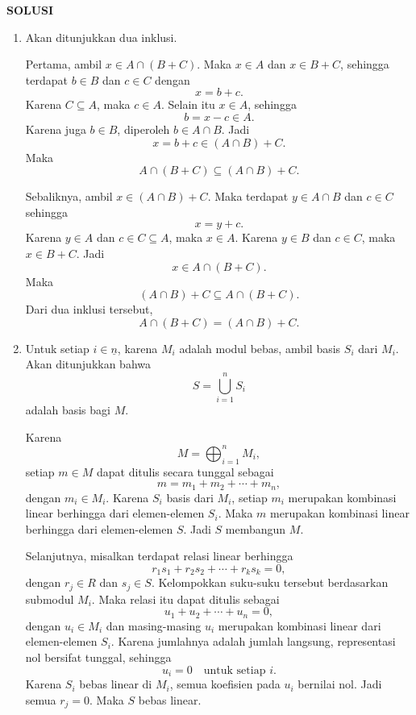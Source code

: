\documentclass[11pt,letterpaper]{article}
\begin{document}
\newpage
\begin{center}
  \textbf{SOLUSI}
\end{center}

\begin{enumerate}
  \item Akan ditunjukkan dua inklusi.

        Pertama, ambil $x \in A \cap (B+C)$. Maka $x \in A$ dan $x \in B+C$, sehingga terdapat $b \in B$ dan $c \in C$ dengan
        \[
          x=b+c.
        \]
        Karena $C \subseteq A$, maka $c \in A$. Selain itu $x \in A$, sehingga
        \[
          b=x-c \in A.
        \]
        Karena juga $b \in B$, diperoleh $b \in A \cap B$. Jadi
        \[
          x=b+c \in (A \cap B)+C.
        \]
        Maka
        \[
          A \cap (B+C) \subseteq (A \cap B)+C.
        \]

        Sebaliknya, ambil $x \in (A \cap B)+C$. Maka terdapat $y \in A \cap B$ dan $c \in C$ sehingga
        \[
          x=y+c.
        \]
        Karena $y \in A$ dan $c \in C \subseteq A$, maka $x \in A$. Karena $y \in B$ dan $c \in C$, maka $x \in B+C$. Jadi
        \[
          x \in A \cap (B+C).
        \]
        Maka
        \[
          (A \cap B)+C \subseteq A \cap (B+C).
        \]
        Dari dua inklusi tersebut,
        \[
          \boxed{A \cap (B+C) = (A \cap B)+C}.
        \]

  \item Untuk setiap $i \in \underline{n}$, karena $M_i$ adalah modul bebas, ambil basis $S_i$ dari $M_i$. Akan ditunjukkan bahwa
        \[
          S=\bigcup_{i=1}^{n} S_i
        \]
        adalah basis bagi $M$.

        Karena
        \[
          M=\bigoplus_{i=1}^{n} M_i,
        \]
        setiap $m \in M$ dapat ditulis secara tunggal sebagai
        \[
          m=m_1+m_2+\cdots+m_n,
        \]
        dengan $m_i \in M_i$. Karena $S_i$ basis dari $M_i$, setiap $m_i$ merupakan kombinasi linear berhingga dari elemen-elemen $S_i$. Maka $m$ merupakan kombinasi linear berhingga dari elemen-elemen $S$. Jadi $S$ membangun $M$.

        Selanjutnya, misalkan terdapat relasi linear berhingga
        \[
          r_1s_1+r_2s_2+\cdots+r_ks_k=0,
        \]
        dengan $r_j \in R$ dan $s_j \in S$. Kelompokkan suku-suku tersebut berdasarkan submodul $M_i$. Maka relasi itu dapat ditulis sebagai
        \[
          u_1+u_2+\cdots+u_n=0,
        \]
        dengan $u_i \in M_i$ dan masing-masing $u_i$ merupakan kombinasi linear dari elemen-elemen $S_i$. Karena jumlahnya adalah jumlah langsung, representasi nol bersifat tunggal, sehingga
        \[
          u_i=0
          \quad \text{untuk setiap } i.
        \]
        Karena $S_i$ bebas linear di $M_i$, semua koefisien pada $u_i$ bernilai nol. Jadi semua $r_j=0$. Maka $S$ bebas linear.


\end{enumerate}
\end{document}

